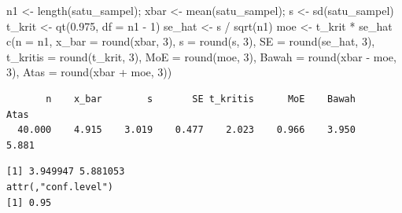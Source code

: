 \documentclass[
  indonesian,
  letterpaper,
]{book}
\newenvironment{Shaded}{\begin{snugshade}}{\end{snugshade}}
\newcommand{\AttributeTok}[1]{\textcolor[rgb]{0.40,0.45,0.13}{#1}}
\newcommand{\CommentTok}[1]{\textcolor[rgb]{0.37,0.37,0.37}{#1}}
\newcommand{\DecValTok}[1]{\textcolor[rgb]{0.68,0.00,0.00}{#1}}
\newcommand{\FloatTok}[1]{\textcolor[rgb]{0.68,0.00,0.00}{#1}}
\newcommand{\FunctionTok}[1]{\textcolor[rgb]{0.28,0.35,0.67}{#1}}
\newcommand{\NormalTok}[1]{\textcolor[rgb]{0.00,0.23,0.31}{#1}}
\newcommand{\OtherTok}[1]{\textcolor[rgb]{0.00,0.23,0.31}{#1}}
\newcommand{\SpecialCharTok}[1]{\textcolor[rgb]{0.37,0.37,0.37}{#1}}
\begin{document}
\begin{Shaded}
\begin{Highlighting}[]
\NormalTok{n1 }\OtherTok{\textless{}{-}} \FunctionTok{length}\NormalTok{(satu\_sampel); xbar }\OtherTok{\textless{}{-}} \FunctionTok{mean}\NormalTok{(satu\_sampel); s }\OtherTok{\textless{}{-}} \FunctionTok{sd}\NormalTok{(satu\_sampel)}
\NormalTok{t\_krit }\OtherTok{\textless{}{-}} \FunctionTok{qt}\NormalTok{(}\FloatTok{0.975}\NormalTok{, }\AttributeTok{df =}\NormalTok{ n1 }\SpecialCharTok{{-}} \DecValTok{1}\NormalTok{)}
\NormalTok{se\_hat }\OtherTok{\textless{}{-}}\NormalTok{ s }\SpecialCharTok{/} \FunctionTok{sqrt}\NormalTok{(n1)}
\NormalTok{moe }\OtherTok{\textless{}{-}}\NormalTok{ t\_krit }\SpecialCharTok{*}\NormalTok{ se\_hat}
\FunctionTok{c}\NormalTok{(}\AttributeTok{n =}\NormalTok{ n1, }\AttributeTok{x\_bar =} \FunctionTok{round}\NormalTok{(xbar, }\DecValTok{3}\NormalTok{), }\AttributeTok{s =} \FunctionTok{round}\NormalTok{(s, }\DecValTok{3}\NormalTok{), }\AttributeTok{SE =} \FunctionTok{round}\NormalTok{(se\_hat, }\DecValTok{3}\NormalTok{), }\AttributeTok{t\_kritis =} \FunctionTok{round}\NormalTok{(t\_krit, }\DecValTok{3}\NormalTok{), }\AttributeTok{MoE =} \FunctionTok{round}\NormalTok{(moe, }\DecValTok{3}\NormalTok{),}
\AttributeTok{Bawah =} \FunctionTok{round}\NormalTok{(xbar }\SpecialCharTok{{-}}\NormalTok{ moe, }\DecValTok{3}\NormalTok{), }\AttributeTok{Atas =} \FunctionTok{round}\NormalTok{(xbar }\SpecialCharTok{+}\NormalTok{ moe, }\DecValTok{3}\NormalTok{))}
\end{Highlighting}
\end{Shaded}

\begin{verbatim}
       n    x_bar        s       SE t_kritis      MoE    Bawah     Atas 
  40.000    4.915    3.019    0.477    2.023    0.966    3.950    5.881 
\end{verbatim}

\begin{Shaded}
\end{Shaded}

\begin{verbatim}
[1] 3.949947 5.881053
attr(,"conf.level")
[1] 0.95
\end{verbatim}
\end{document}
